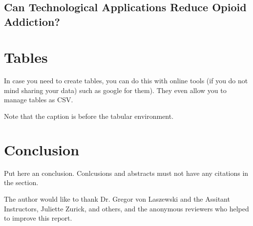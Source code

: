 \documentclass[sigconf]{acmart}
\begin{document}

\subsection{Can Technological Applications Reduce Opioid Addiction? }




\section{Tables}

In case you need to create tables, you can do this with online tools
(if you do not mind sharing your data) such as
google for them). They even allow you to manage tables as CSV.

Note that the caption is before the tabular environment.



\section{Conclusion}

Put here an conclusion. Conlcusions and abstracts must not have any
citations in the section.


\begin{acks}

    The author would like to thank Dr. Gregor von Laszewski and the 
    Assitant Instructors, Juliette Zurick, and others, and the 
    anonymous reviewers who helped to improve this report. 

\end{acks}
\end{document}
